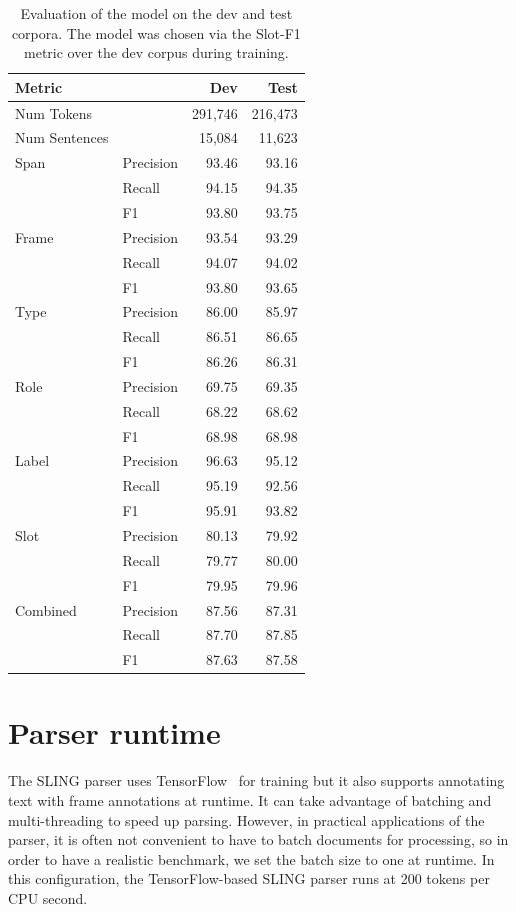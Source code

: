 \documentclass[11pt,a4paper]{article}
\begin{document}
\begin{table}[ht]
\begin{tabular}{|ll|r|r|}
\hline
{\bf Metric} & & {\bf Dev} & {\bf Test} \\
\hline
Num Tokens & & 291,746  & 216,473  \\
\hline
Num Sentences &   & 15,084 & 11,623  \\
\hline
\hline
Span & Precision & 93.46  & 93.16 \\
\hline
& Recall & 94.15 & 94.35 \\
\hline
& F1 & 93.80 & 93.75 \\
\hline
Frame & Precision & 93.54 & 93.29 \\
\hline
& Recall & 94.07 & 94.02 \\
\hline
& F1 & 93.80 & 93.65\\
\hline
Type & Precision & 86.00  & 85.97 \\
\hline
& Recall & 86.51 & 86.65 \\
\hline
& F1 & 86.26 & 86.31 \\
\hline
Role & Precision & 69.75 & 69.35 \\
\hline
& Recall & 68.22 & 68.62 \\
\hline
& F1 & 68.98 &68.98 \\
\hline
Label & Precision & 96.63 &95.12 \\
\hline
& Recall & 95.19 & 92.56 \\
\hline
& F1 & 95.91 & 93.82 \\
\hline
Slot & Precision & 80.13 & 79.92 \\
\hline
& Recall & 79.77 & 80.00 \\
\hline
& F1 & 79.95 & 79.96 \\
\hline
Combined & Precision & 87.56 & 87.31 \\
\hline
& Recall & 87.70 & 87.85 \\
\hline
& F1 & 87.63 & 87.58 \\
\hline
\end{tabular}
\caption{Evaluation of the model on the dev and test corpora. The model was
chosen via the Slot-F1 metric over the dev corpus during training.}
\label{tab:eval}
\end{table}


\section{Parser runtime}

The SLING parser uses TensorFlow~\cite{tensorflow} for training but it also
supports annotating text with frame annotations at runtime. It can take
advantage of batching and multi-threading to speed up parsing. However, in
practical applications of the parser, it is often not convenient to have to
batch documents for processing, so in order to have a realistic benchmark, we
set the batch size to one at runtime. In this configuration, the
TensorFlow-based SLING parser runs at 200 tokens per CPU second.
\end{document}
